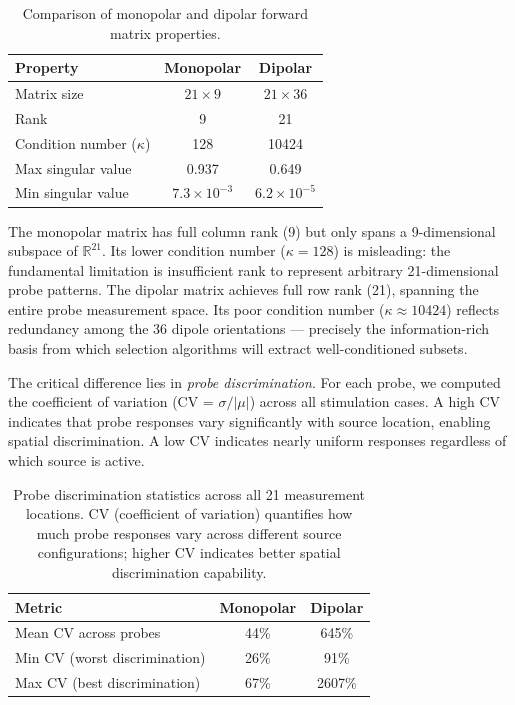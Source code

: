 \begin{table}[h]
\centering
\caption[Forward matrix properties comparison]{Comparison of monopolar and dipolar forward matrix properties.}
\label{tab:mono-vs-dip-matrix}
\begin{tabular}{lcc}
\toprule
\textbf{Property} & \textbf{Monopolar} & \textbf{Dipolar} \\
\midrule
Matrix size & $21 \times 9$ & $21 \times 36$ \\
Rank & 9 & 21 \\
Condition number ($\kappa$) & 128 & 10424 \\
Max singular value & 0.937 & 0.649 \\
Min singular value & $7.3 \times 10^{-3}$ & $6.2 \times 10^{-5}$ \\
\bottomrule
\end{tabular}
\end{table}

The monopolar matrix has full column rank (9) but only spans a 9-dimensional
subspace of $\mathbb{R}^{21}$. Its lower condition number ($\kappa = 128$) is
misleading: the fundamental limitation is insufficient rank to represent arbitrary
21-dimensional probe patterns. The dipolar matrix achieves full row rank (21),
spanning the entire probe measurement space. Its poor condition number ($\kappa \approx 10424$)
reflects redundancy among the 36 dipole orientations --- precisely the information-rich
basis from which selection algorithms will extract well-conditioned subsets.

The critical difference lies in \emph{probe discrimination}. For each probe, we computed
the coefficient of variation (CV = $\sigma / \lvert\mu\rvert$) across all stimulation
cases. A high CV indicates that probe responses vary significantly with source location,
enabling spatial discrimination. A low CV indicates nearly uniform responses regardless
of which source is active.

\begin{table}[h]
\centering
\caption[Probe discrimination statistics]{Probe discrimination statistics across all 21 measurement locations. CV (coefficient of variation) quantifies how much probe responses vary across different source configurations; higher CV indicates better spatial discrimination capability.}
\label{tab:mono-vs-dip-cv}
\begin{tabular}{lcc}
\toprule
\textbf{Metric} & \textbf{Monopolar} & \textbf{Dipolar} \\
\midrule
Mean CV across probes & 44\% & 645\% \\
Min CV (worst discrimination) & 26\% & 91\% \\
Max CV (best discrimination) & 67\% & 2607\% \\
\bottomrule
\end{tabular}
\end{table}


